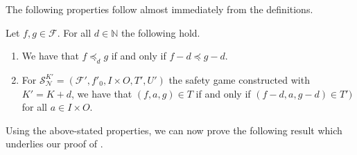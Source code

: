 \documentclass[runningheads,a4paper,draft]{llncs}
\newcommand{\calF}{\mathcal{F}}
\newcommand{\calN}{\mathcal{N}}
\newcommand{\calS}{\mathcal{S}}
\begin{document}
The following properties follow almost immediately from the definitions.
\begin{lemma}\label{lem:simple-props}
  Let $f,g \in \calF$. For all $d \in \mathbb{N}$ the following hold.
  \begin{enumerate}
    \item We have that $f \preceq_d g$ if and only
      if $f - d \preceq g - d$. \label{itm:ord-op}
    \item For $\calS^{K'}_\calN = (\calF',f'_0,I \times O,T',U')$ the safety
      game constructed with $K' = K + d$, we have that $(f,a,g) \in T$ if and
      only if $(f - d, a, g - d) \in T')$ for all $a \in I \times O$.
      \label{itm:op-games}
  \end{enumerate}
\end{lemma}

Using the above-stated properties, we can now prove the following result which
underlies our proof of .
\end{document}
